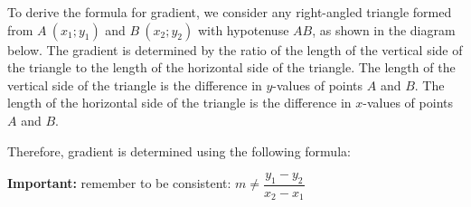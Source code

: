 \setcounter{subfigure}{0}
\begin{figure}[H] %
\begin{center}
\end{center}
\end{figure}        
To derive the formula for gradient, we consider any right-angled triangle formed from $A~(x_1;y_1)$ and $B~(x_2;y_2)$ with hypotenuse $AB$, as shown in the diagram below. The gradient is determined by the ratio of the length of the vertical side of the triangle to the length of the horizontal side of the triangle. The length of the vertical side of the triangle is the difference in $y$-values of points $A$ and $B$. The length of the horizontal side of the triangle is the difference in $x$-values of points $A$ and $B$. 
\setcounter{subfigure}{0}
\begin{figure}[H] %
\begin{center}
\end{center}
\end{figure}  
Therefore, gradient is determined using the following formula:

\textbf{Important:} remember to be consistent: $m \neq \dfrac{y_{1} - y_{2}}{x_{2} - x_{1}}$

